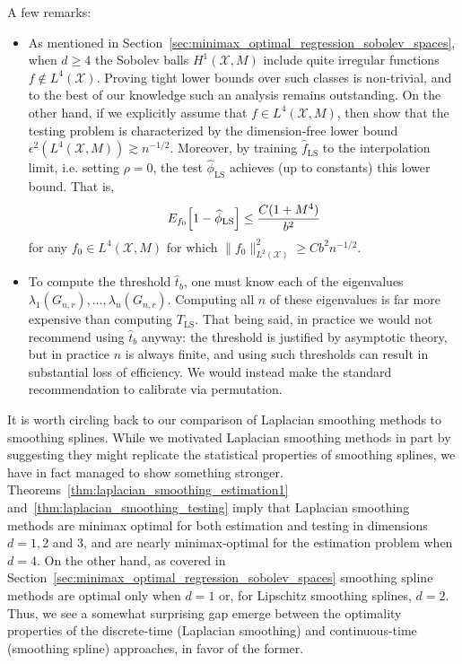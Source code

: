 \documentclass[twoside]{article}
\newcommand{\1}{\mathbf{1}}
\newcommand{\Xset}{\mathcal{X}}
\newcommand{\Leb}{L}
\newcommand{\wh}[1]{\widehat{#1}}
\newcommand{\LS}{\mathrm{LS}}
\theoremstyle{definition}
\theoremstyle{remark}
\begin{document}
A few remarks:
\begin{itemize}
	\item As mentioned in Section~\ref{sec:minimax_optimal_regression_sobolev_spaces}, when $d \geq 4$ the Sobolev balls $H^1(\Xset,M)$ include quite irregular functions $f \not\in \Leb^4(\Xset)$. Proving tight lower bounds over such classes is non-trivial, and to the best of our knowledge such an analysis remains outstanding. On the other hand, if we explicitly assume that $f \in \Leb^4(\Xset,M)$, then \cite{guerre02} show that the testing problem is characterized by the dimension-free lower bound $\epsilon^{2}(\Leb^4(\Xset,M)) \gtrsim n^{-1/2}$. Moreover, by training $\wh{f}_{\LS}$ to the interpolation limit, i.e. setting $\rho = 0$, the test $\wh{\phi}_{\LS}$ achieves (up to constants) this lower bound. That is, 
	\begin{equation}
	\label{eqn:laplacian_smoothing_testing_low_smoothness}
	E_{f_0}\Bigl[1 - \wh{\phi}_{\LS}\Bigr] \leq \frac{C(1 + M^4)}{b^2}
	\end{equation}
	for any $f_0 \in \Leb^4(\Xset,M)$ for which $\|f_0\|_{\Leb^2(\Xset)}^2 \geq C b^2n^{-1/2}$. 
	\item To compute the threshold $\wh{t}_b$, one must know each of the eigenvalues $\lambda_1(G_{n,r}),\ldots,\lambda_n(G_{n,r})$. Computing all $n$ of these eigenvalues is far more expensive than computing $T_{\LS}$. That being said, in practice we would not recommend using $\wh{t}_b$ anyway: the threshold is justified by asymptotic theory, but in practice $n$ is always finite, and using such thresholds can result in substantial loss of efficiency. We would instead make the standard recommendation to calibrate via permutation. 
\end{itemize}
It is worth circling back to our comparison of Laplacian smoothing methods to smoothing splines. While we motivated Laplacian smoothing methods in part by suggesting they might replicate the statistical properties of smoothing splines, we have in fact managed to show something stronger. Theorems~\ref{thm:laplacian_smoothing_estimation1} and~\ref{thm:laplacian_smoothing_testing} imply that Laplacian smoothing methods are minimax optimal for both estimation and testing in dimensions $d = 1,2$ and $3$, and are nearly minimax-optimal for the estimation problem when $d = 4$. On the other hand, as covered in Section~\ref{sec:minimax_optimal_regression_sobolev_spaces} smoothing spline methods are optimal only when $d = 1$ or, for Lipschitz smoothing splines, $d = 2$. Thus, we see a somewhat surprising gap emerge between the optimality properties of the discrete-time (Laplacian smoothing) and continuous-time (smoothing spline) approaches, in favor of the former.
\end{document}
